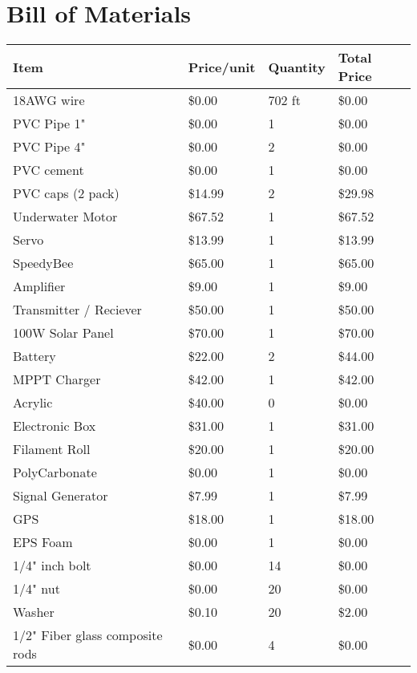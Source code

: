 \section{Bill of Materials}
\begin{table}[H]
    \centering
    \begin{tabular}{|l|l|l|l|}
    \hline
        Item & Price/unit & Quantity & Total Price \\ \hline
        18AWG wire & \$0.00 & 702 ft & \$0.00 \\ \hline
        PVC Pipe 1" & \$0.00 & 1 & \$0.00 \\ \hline
        PVC Pipe 4" & \$0.00 & 2 & \$0.00 \\ \hline
        PVC cement & \$0.00 & 1 & \$0.00 \\ \hline
        PVC caps (2 pack) & \$14.99 & 2 & \$29.98 \\ \hline
        Underwater Motor & \$67.52 & 1 & \$67.52 \\ \hline
        Servo & \$13.99 & 1 & \$13.99 \\ \hline
        SpeedyBee & \$65.00 & 1 & \$65.00 \\ \hline
        Amplifier & \$9.00 & 1 & \$9.00 \\ \hline
        Transmitter / Reciever & \$50.00 & 1 & \$50.00 \\ \hline
        100W Solar Panel & \$70.00 & 1 & \$70.00 \\ \hline
        Battery & \$22.00 & 2 & \$44.00 \\ \hline
        MPPT Charger & \$42.00 & 1 & \$42.00 \\ \hline
        Acrylic & \$40.00 & 0 & \$0.00 \\ \hline
        Electronic Box & \$31.00 & 1 & \$31.00 \\ \hline
        Filament Roll & \$20.00 & 1 & \$20.00 \\ \hline
        PolyCarbonate & \$0.00 & 1 & \$0.00 \\ \hline
        Signal Generator & \$7.99 & 1 & \$7.99 \\ \hline
        GPS & \$18.00 & 1 & \$18.00 \\ \hline
        EPS Foam & \$0.00 & 1 & \$0.00 \\ \hline
        1/4" inch bolt  & \$0.00 & 14 & \$0.00 \\ \hline
        1/4" nut & \$0.00 & 20 & \$0.00 \\ \hline
        Washer & \$0.10 & 20 & \$2.00 \\ \hline
        1/2" Fiber glass composite rods & \$0.00 & 4 & \$0.00 \\ \hline

\end{tabular}
\end{table}
